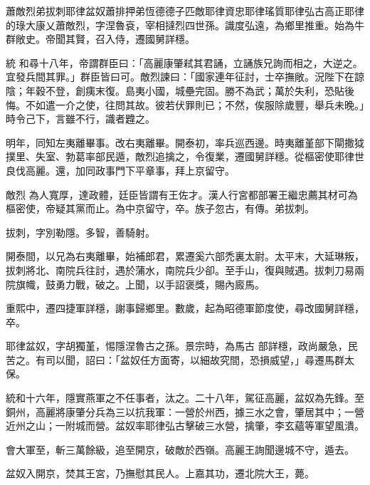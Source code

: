 
\begin{pinyinscope}

 蕭敵烈弟拔刺耶律盆奴蕭排押弟恆德德子匹敵耶律資忠耶律瑤質耶律弘古高正耶律的琭大康乂蕭敵烈，字涅魯袞，宰相撻烈四世孫。識度弘遠，為鄉里推重。始為牛群敞史。帝聞其賢，召入侍，遷國舅詳穩。



 統
 和尋十八年，帝謂群臣曰：「高麗康肇弒其君誦，立誦族兄詢而相之，大逆之。宜發兵間其罪。」群臣皆曰可。敵烈諫曰：「國家連年征討，士卒撫敞。況陛下在諒陰；年穀不登，創痍末復。島夷小國，城壘完固。勝不為武；萬於失利，恐貼後悔。不如遣一介之使，往問其故。彼若伏罪則已；不然，俟服除歲豐，舉兵未晚。」時令己下，言雖不行，識者韙之。



 明年，同知左夷離畢事。改右夷離畢。開泰初，率兵巡西邊。時夷離堇部下閘撒狘撲里、失室、勃葛率部民遁，敵烈追擒之，令復業，遷國舅詳穩。從樞密使耶律世良伐高麗。還，加同政事門下平章事，拜上京留守。



 敵烈
 為人寬厚，達政體，廷臣皆謂有王佐才。漢人行宮都部署王繼忠薦其材可為樞密使，帝疑其黨而止。為中京留守，卒。族子忽古，有傳。弟拔刺。



 拔刺，字別勒隱。多智，善騎射。



 開泰間，以兄為右夷離畢，始補郎君，累遷奚六部禿裏太尉。太平末，大延琳叛，拔刺將北、南院兵往討，遇於蒲水，南院兵少卻。至手山，復與賊遇。拔刺刀易兩院旗幟，鼓勇力戰，破之。上聞，以手詔褒獎，賜內廄馬。



 重熙中，遷四捷軍詳穩，謝事歸鄉里。數歲，起為昭德軍節度使，尋改國舅詳穩，卒。



 耶律盆奴，字胡獨堇，惕隱涅魯古之孫。景宗時，為馬古
 部詳穩，政尚嚴急，民苦之。有司以聞，詔曰：「盆奴任方面寄，以細故究間，恐損威望，」尋遷馬群太保。



 統和十六年，隱實燕軍之不任事者，汰之。二十八年，駕征高麗，盆奴為先鋒。至銅州，高麗將康肇分兵為三以抗我軍：一營於州西，據三水之會，肇居其中；一營近州之山；一附城而營。盆奴率耶律弘古擊破三水營，擒肇，李玄蘊等軍望風潰。



 會大軍至，斬三萬餘級，追至開京，破敵於西嶺。高麗王詢聞邊城不守，遁去。



 盆奴入開京，焚其王宮，乃撫慰其民人。上嘉其功，遷北院大王，薨。




\end{pinyinscope}
